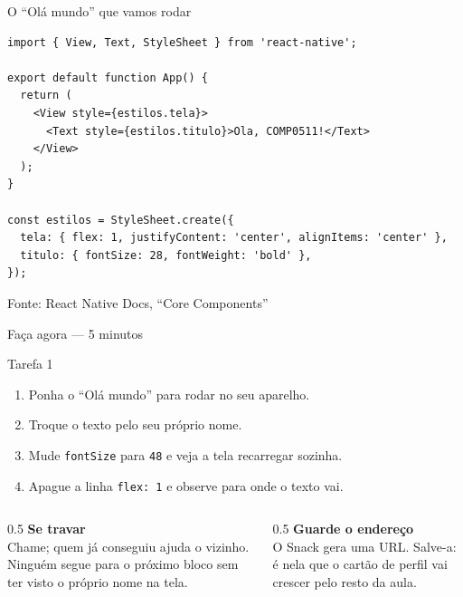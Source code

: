 \documentclass[aspectratio=169]{beamer}
\newcommand{\fonte}[1]{\vfill\hfill{\scriptsize\textcolor{UFSGray}{Fonte: #1}}}
\begin{document}
\begin{frame}[fragile]{O ``Olá mundo'' que vamos rodar}
\begin{lstlisting}[style=js]
import { View, Text, StyleSheet } from 'react-native';

export default function App() {
  return (
    <View style={estilos.tela}>
      <Text style={estilos.titulo}>Ola, COMP0511!</Text>
    </View>
  );
}

const estilos = StyleSheet.create({
  tela: { flex: 1, justifyContent: 'center', alignItems: 'center' },
  titulo: { fontSize: 28, fontWeight: 'bold' },
});
\end{lstlisting}
  \fonte{React Native Docs, ``Core Components''~\cite{reactnative2025docs}}
\end{frame}

\begin{frame}{Faça agora --- 5 minutos}
  \begin{block}{Tarefa 1}
    \begin{enumerate}
      \item Ponha o ``Olá mundo'' para rodar no seu aparelho.
      \item Troque o texto pelo seu próprio nome.
      \item Mude \texttt{fontSize} para \texttt{48} e veja a tela recarregar sozinha.
      \item Apague a linha \texttt{flex: 1} e observe para onde o texto vai.
    \end{enumerate}
  \end{block}
  \begin{columns}[T]
    \begin{column}{0.5\textwidth}
      \textbf{Se travar}\\
      Chame; quem já conseguiu ajuda o vizinho. Ninguém segue para o próximo
      bloco sem ter visto o próprio nome na tela.
    \end{column}
    \begin{column}{0.5\textwidth}
      \textbf{Guarde o endereço}\\
      O Snack gera uma URL. Salve-a: é nela que o cartão de perfil vai crescer
      pelo resto da aula.
    \end{column}
  \end{columns}
\end{frame}
\end{document}
